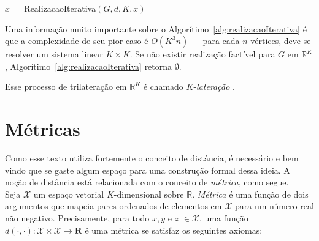 \documentclass[a4paper,12pt]{article}
\begin{document}
\begin{algorithm}[H]
	\label{alg:realizacaoIterativa}
	\caption{$x =$ RealizacaoIterativa$(G,d, K, x)$ \cite{libertiEDG}}
\end{algorithm}
\vspace{0.5cm}
Uma informação muito importante sobre o Algorítimo~\ref{alg:realizacaoIterativa} é que a complexidade de seu pior caso é $O(K^3n)$ --- para cada $n$ vértices, deve-se resolver um sistema linear $K\times K$. Se não existir realização factível para $G$ em $\mathbb{R}^K$, Algorítimo~\ref{alg:realizacaoIterativa} retorna $\emptyset$.

Esse processo de trilateração em $\mathbb{R}^K$ é chamado $K$-\textit{lateração} \cite{eren2004rigidity, libertiEDG}.

\newpage
{}
{}




\appendix
\newpage
\section{Métricas}
\label{ap:metric}

Como esse texto utiliza fortemente o conceito de distância, é necessário e bem vindo que se gaste algum espaço para uma construção formal dessa ideia. A noção de distância está relacionada com o conceito de \textit{métrica}, como segue.
\\

Seja $\mathcal{X}$ um espaço vetorial $K$-dimensional sobre $\mathbb{R}$. \textit{Métrica} é uma função de dois argumentos que mapeia pares ordenados de elementos em $\mathcal{X}$ para um número real não negativo. Precisamente, para todo $x, y$ e $z$ $\in \mathcal{X}$, uma função $d(\cdot,\cdot): \mathcal{X} \times \mathcal{X} \longrightarrow \mathbf{R}$ é uma métrica se satisfaz os seguintes axiomas:
\end{document}
